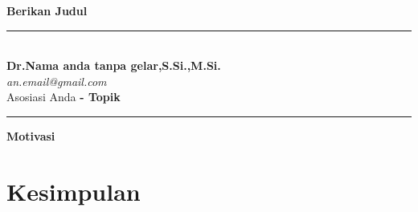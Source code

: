 \documentclass{article}   %
\makeatletter
\newcommand{\judul}{Berikan Judul}
\newcommand{\nama}{Nama anda tanpa gelar}
\newcommand{\gelardepan}{Dr.}
\newcommand{\gelarbelakang}{S.Si.,M.Si.}
\newcommand{\email}{an.email@gmail.com}
\newcommand{\matkul}{Topik}
\newcommand{\asosiasi}{Asosiasi Anda}
\makeatother
\begin{document}
\thispagestyle{empty}
\begin{center}
    \vspace{.4cm}
    \textsf{\textbf { \large \judul}}
\end{center}
\vspace{.4cm}
\hrule
	\textsf{\\
		\textbf{\gelardepan\nama,\gelarbelakang} \hspace{\fill}
		\textit{\large }\\ [0.7ex]
		\textit{\email} \hspace{\fill} \textbf{}\\ [0.7ex]
		\asosiasi \hspace{\fill} \textbf{- \matkul }} \\
	\hrule
\vspace{.4cm}
\begin{center}
\textbf{\Large Motivasi}
\end{center}
\paragraph*{} 
\lipsum[4]\cite{zz}





\section{Kesimpulan}
\paragraph*{} \lipsum[5]\cite{zz,zz1,zz2,zz3}


\end{document}
